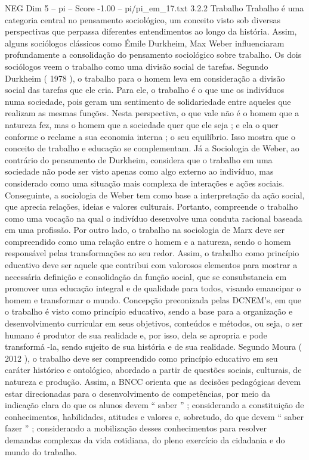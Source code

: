 \begin{textsample}{NEG Dim 5 – pi – Score -1.00 – pi/pi\_em\_17.txt}  \label{ex:f5_neg_054}
3.2.2 Trabalho Trabalho é uma categoria central no pensamento sociológico, um conceito visto sob diversas perspectivas que perpassa diferentes entendimentos ao longo da história.
Assim, alguns sociólogos clássicos como Émile Durkheim, Max Weber influenciaram profundamente a consolidação do pensamento sociológico sobre trabalho.
Os dois sociólogos veem o trabalho como uma divisão social de tarefas.
Segundo Durkheim ( 1978 ), o trabalho para o homem leva em consideração a divisão social das tarefas que ele cria.
Para ele, o trabalho é o que une os indivíduos numa sociedade, pois geram um sentimento de solidariedade entre aqueles que realizam as mesmas funções.
Nesta perspectiva, o que vale não é o homem que a natureza fez, mas o homem que a sociedade quer que ele seja ; e ela o quer conforme o reclame a sua economia interna ; o seu equilíbrio.
Isso mostra que o conceito de trabalho e educação se complementam.
Já a Sociologia de Weber, ao contrário do pensamento de Durkheim, considera que o trabalho em uma sociedade não pode ser visto apenas como algo externo ao indivíduo, mas considerado como uma situação mais complexa de interações e ações sociais.
Conseguinte, a sociologia de Weber tem como base a interpretação da ação social, que aprecia relações, ideias e valores culturais.
Portanto, compreende o trabalho como uma vocação na qual o indivíduo desenvolve uma conduta racional baseada em uma profissão.
Por outro lado, o trabalho na sociologia de Marx deve ser compreendido como uma relação entre o homem e a natureza, sendo o homem responsável pelas transformações ao seu redor.
Assim, o trabalho como princípio educativo deve ser aquele que contribui com valorosos elementos para mostrar a necessária definição e consolidação da função social, que se consubstancia em promover uma educação integral e de qualidade para todos, visando emancipar o homem e transformar o mundo.
Concepção preconizada pelas DCNEM’s, em que o trabalho é visto como princípio educativo, sendo a base para a organização e desenvolvimento curricular em seus objetivos, conteúdos e métodos, ou seja, o ser humano é produtor de sua realidade e, por isso, dela se apropria e pode transformá -la, sendo sujeito de sua história e de sua realidade.
Segundo Moura ( 2012 ), o trabalho deve ser compreendido como princípio educativo em seu caráter histórico e ontológico, abordado a partir de questões sociais, culturais, de natureza e produção.
Assim, a BNCC orienta que as decisões pedagógicas devem estar direcionadas para o desenvolvimento de competências, por meio da indicação clara do que os alunos devem “ saber ” ; considerando a constituição de conhecimentos, habilidades, atitudes e valores e, sobretudo, do que devem “ saber fazer ” ; considerando a mobilização desses conhecimentos para resolver demandas complexas da vida cotidiana, do pleno exercício da cidadania e do mundo do trabalho.

\end{textsample}
